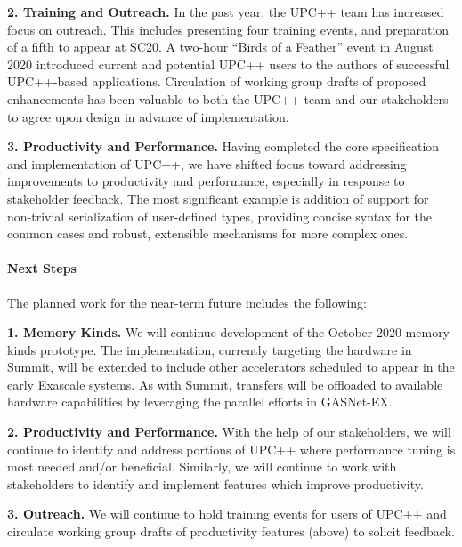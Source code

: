 \textbf{2. Training and Outreach.}
In the past year, the UPC++ team has increased focus on outreach.  This includes
presenting four training events, and preparation of a fifth to appear at SC20.
A two-hour ``Birds of a Feather'' event in August 2020 introduced current and
potential UPC++ users to the authors of successful UPC++-based applications.
Circulation of working group drafts of proposed enhancements has
been valuable to both the UPC++ team and our stakeholders to agree upon design
in advance of implementation.

\textbf{3. Productivity and Performance.}
Having completed the core specification and implementation of UPC++, we have
shifted focus toward addressing improvements to productivity and performance,
especially in response to stakeholder feedback.  The most significant
example is addition of support for non-trivial serialization of
user-defined types, providing concise syntax for the common cases and
robust, extensible mechanisms for more complex ones.

\paragraph{Next Steps}

The planned work for the near-term future includes the following:

\textbf{1. Memory Kinds.}
We will continue development of the October 2020 memory kinds prototype.  The
implementation, currently targeting the hardware in Summit, will be extended to
include other accelerators scheduled to appear in the early Exascale systems.
As with Summit, transfers will be offloaded to available hardware capabilities
by leveraging the parallel efforts in GASNet-EX.

\textbf{2. Productivity and Performance.}
With the help of our stakeholders, we will continue to identify and address
portions of UPC++ where performance tuning is most needed
and/or beneficial.  Similarly, we will continue to work with stakeholders to
identify and implement features which improve productivity.

\textbf{3. Outreach.}
We will continue to hold training events for users of UPC++ and circulate
working group drafts of productivity features (above) to solicit feedback.
